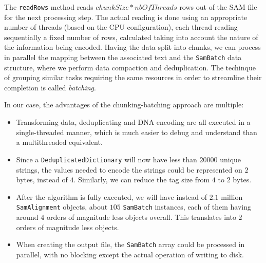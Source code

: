 \documentclass[a4paper,twoside]{article}
\begin{document}
The {\texttt{readRows}} method reads $chunkSize * nbOfThreads$ rows out of the SAM file for the next processing step.
The actual reading is done using an appropriate number of threads (based on the CPU configuration), each thread reading sequentially a fixed number of rows, calculated taking into account the nature of the information being encoded.
Having the data split into chunks, we can process in parallel the mapping between the associated text and the {\texttt{SamBatch}} data structure, where we perform data compaction and deduplication.
The techinque of grouping similar tasks requiring the same resources in order to streamline their completion is called {\textit{batching}}.

In our case, the advantages of the chunking-batching approach are multiple:
\begin{itemize}
\item Transforming data, deduplicating and DNA encoding are all executed in a single-threaded manner, which is much easier to debug and understand than a multithreaded equivalent.

\item Since a {\texttt{DeduplicatedDictionary}} will now have less than $20000$ unique strings, the values needed to encode the strings could be represented on $2$ bytes, instead of $4$.
Similarly, we can reduce the tag size from $4$ to $2$ bytes.

\item After the algorithm is fully executed,  we will have instead of $2.1$ million {\texttt{SamAlignment}} objects, about $105$ {\texttt{SamBatch}} instances, each of them having around $4$ orders of magnitude less objects overall.
This translates into $2$ orders of magnitude less objects.

\item When creating the output file, the {\texttt{SamBatch}} array could be processed in parallel, with no blocking except the actual operation of writing to disk.
\end{itemize}
\end{document}
